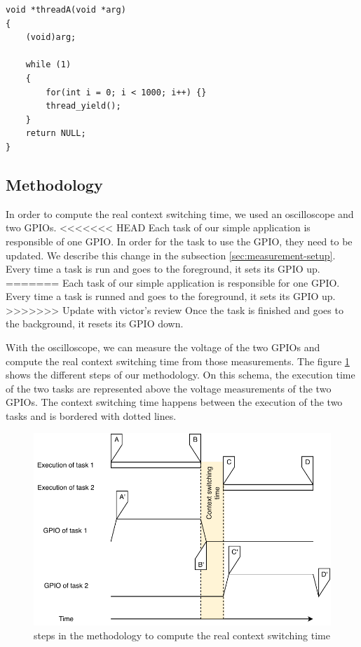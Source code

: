 \begin{lstlisting}[style=CStyle, float, label={lst:simple-task-code-riot}, caption={source code of a task implemented in RIOT for the simple application}]
void *threadA(void *arg)
{
    (void)arg;

    while (1)
    {
        for(int i = 0; i < 1000; i++) {}
        thread_yield();
    }
    return NULL;
}
\end{lstlisting}


\subsection{Methodology}

In order to compute the real context switching time, we used an oscilloscope and two GPIOs.
<<<<<<< HEAD
Each task of our simple application is responsible of one GPIO.
In order for the task to use the GPIO, they need to be updated.
We describe this change in the subsection \ref{sec:measurement-setup}.
Every time a task is run and goes to the foreground, it sets its GPIO up.
=======
Each task of our simple application is responsible for one GPIO.
Every time a task is runned and goes to the foreground, it sets its GPIO up.
>>>>>>> Update with victor's review
Once the task is finished and goes to the background, it resets its GPIO down.

With the oscilloscope, we can measure the voltage of the two GPIOs and compute the real context switching time from those measurements.
The figure \ref{fig:real-context-switching-time-measurement} shows the different steps of our methodology.
On this schema, the execution time of the two tasks are represented above the voltage measurements of the two GPIOs.
The context switching time happens between the execution of the two tasks and is bordered with dotted lines.

\begin{figure}[!ht]
  \centering
  \includegraphics[scale=1]{assets/real-context-switching-time-measurement.pdf}
  \caption{\label{fig:real-context-switching-time-measurement}steps in the methodology to compute the real context switching time}
\end{figure}

